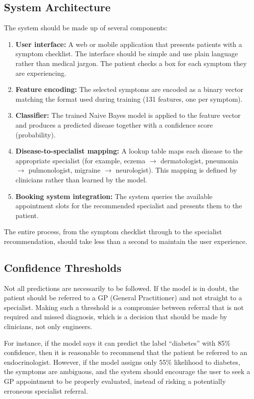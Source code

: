 \subsection{System Architecture}

The system should be made up of several components:

\begin{enumerate}
    \item \textbf{User interface:} A web or mobile application that presents patients with a symptom checklist. The interface should be simple and use plain language rather than medical jargon. The patient checks a box for each symptom they are experiencing.
    \item \textbf{Feature encoding:} The selected symptoms are encoded as a binary vector matching the format used during training (131 features, one per symptom).
    \item \textbf{Classifier:} The trained Naive Bayes model is applied to the feature vector and produces a predicted disease together with a confidence score (probability).
    \item \textbf{Disease-to-specialist mapping:} A lookup table maps each disease to the appropriate specialist (for example, eczema $\rightarrow$ dermatologist, pneumonia $\rightarrow$ pulmonologist, migraine $\rightarrow$ neurologist). This mapping is defined by clinicians rather than learned by the model.
    \item \textbf{Booking system integration:} The system queries the available appointment slots for the recommended specialist and presents them to the patient.
\end{enumerate}

The entire process, from the symptom checklist through to the specialist recommendation, should take less than a second to maintain the user experience.

\subsection{Confidence Thresholds}

Not all predictions are necessarily to be followed. If the model is in doubt, the patient should be referred to a GP (General Practitioner) and not straight to a specialist. Making such a threshold is a compromise between referral that is not required and missed diagnosis, which is a decision that should be made by clinicians, not only engineers.

For instance, if the model says it can predict the label ``diabetes'' with 85\% confidence, then it is reasonable to recommend that the patient be referred to an endocrinologist. However, if the model assigns only 55\% likelihood to diabetes, the symptoms are ambiguous, and the system should encourage the user to seek a GP appointment to be properly evaluated, instead of risking a potentially erroneous specialist referral.

